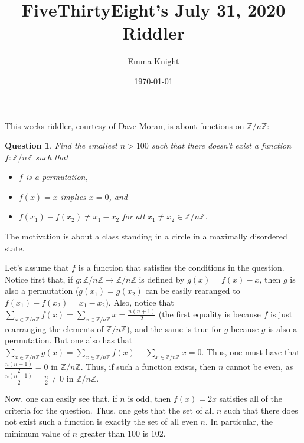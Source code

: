 \documentclass[11pt]{article}
\title{FiveThirtyEight's July 31, 2020 Riddler}
\author{Emma Knight}
\date{\today}
\newtheorem{question}[theorem]{Question}
\theoremstyle{definition}
\newcommand{\Z}{\mathbb{Z}}
\begin{document}
\maketitle
This weeks riddler, courtesy of Dave Moran, is about functions on $\Z/n\Z$:
\begin{question}
Find the smallest $n > 100$ such that there doesn't exist a function $f: \Z/n\Z$ such that
\begin{itemize}
\item $f$ is a permutation,
\item $f(x) = x$ implies $x = 0$, and
\item $f(x_1) - f(x_2) \neq x_1-x_2$ for all $x_1 \neq x_2 \in \Z/n\Z$.
\end{itemize}
\end{question}
The motivation is about a class standing in a circle in a maximally disordered state.

Let's assume that $f$ is a function that satisfies the conditions in the question.  Notice first that, if $g: \Z/n\Z \rightarrow \Z/n\Z$ is defined by $g(x) = f(x) - x$, then $g$ is also a permutation ($g(x_1) = g(x_2)$ can be easily rearanged to $f(x_1) - f(x_2) = x_1-x_2$).  Also, notice that $\displaystyle{\sum_{x \in \Z/n\Z} f(x) = \sum_{x \in \Z/n\Z} x = \frac{n(n+1)}{2}}$ (the first equality is because $f$ is just rearranging the elements of $\Z/n\Z$), and the same is true for $g$ because $g$ is also a permutation.  But one also has that $\displaystyle{\sum_{x \in \Z/n\Z} g(x) = \sum_{x \in \Z/n\Z} f(x) - \sum_{x \in \Z/n\Z} x = 0}$.  Thus, one must have that $\frac{n(n+1)}{2} = 0$ in $\Z/n\Z$.  Thus, if such a function exists, then $n$ cannot be even, as $\frac{n(n+1)}{2} = \frac{n}{2} \neq 0$ in $\Z/n\Z$.

Now, one can easily see that, if $n$ is odd, then $f(x) = 2x$ satisfies all of the criteria for the question.  Thus, one gets that the set of all $n$ such that there does not exist such a function is exactly the set of all even $n$.  In particular, the minimum value of $n$ greater than $100$ is $102$.
\end{document}
